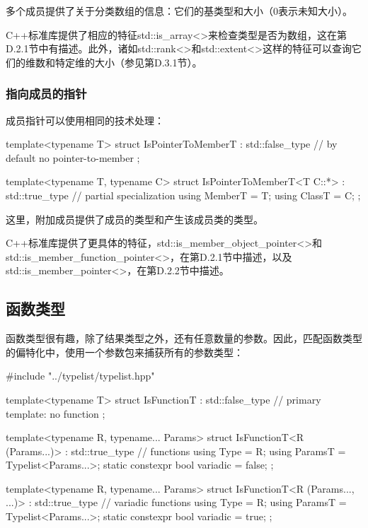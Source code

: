 多个成员提供了关于分类数组的信息：它们的基类型和大小（0表示未知大小）。

C++标准库提供了相应的特征std::is\_array<>来检查类型是否为数组，这在第D.2.1节中有描述。此外，诸如std::rank<>和std::extent<>这样的特征可以查询它们的维数和特定维的大小（参见第D.3.1节）。

\subsubsection{指向成员的指针}

成员指针可以使用相同的技术处理：

\begin{cpp}
template<typename T>
struct IsPointerToMemberT : std::false_type { // by default no pointer-to-member
};

template<typename T, typename C>
struct IsPointerToMemberT<T C::*> : std::true_type { // partial specialization
	using MemberT = T;
	using ClassT = C;
};
\end{cpp}

这里，附加成员提供了成员的类型和产生该成员类的类型。

C++标准库提供了更具体的特征，std::is\_member\_object\_pointer<>和std::is\_member\_function\_pointer<>，在第D.2.1节中描述，以及std::is\_member\_pointer<>，在第D.2.2节中描述。

\subsection{函数类型}

函数类型很有趣，除了结果类型之外，还有任意数量的参数。因此，匹配函数类型的偏特化中，使用一个参数包来捕获所有的参数类型：

\begin{cpp}
#include "../typelist/typelist.hpp"

template<typename T>
struct IsFunctionT : std::false_type { // primary template: no function
};

template<typename R, typename... Params>
struct IsFunctionT<R (Params...)> : std::true_type { // functions
	using Type = R;
	using ParamsT = Typelist<Params...>;
	static constexpr bool variadic = false;
};

template<typename R, typename... Params>
struct IsFunctionT<R (Params..., ...)> : std::true_type { // variadic functions
	using Type = R;
	using ParamsT = Typelist<Params...>;
	static constexpr bool variadic = true;
};
\end{cpp}

